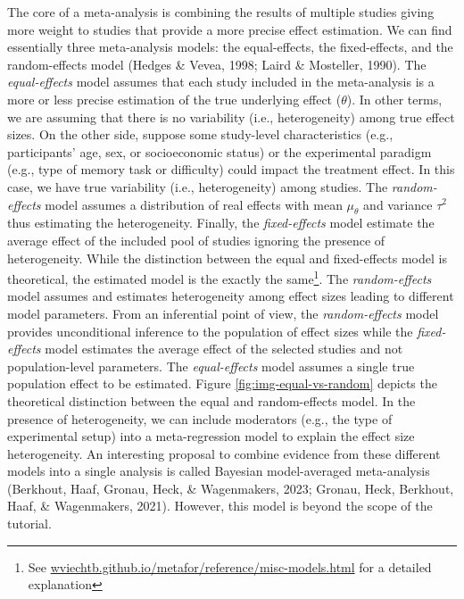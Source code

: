 \documentclass[
  man,floatsintext]{apa6}
\begin{document}
The core of a meta-analysis is combining the results of multiple studies giving more weight to studies that provide a more precise effect estimation. We can find essentially three meta-analysis models: the equal-effects, the fixed-effects, and the random-effects model (Hedges \& Vevea, 1998; Laird \& Mosteller, 1990). The \emph{equal-effects} model assumes that each study included in the meta-analysis is a more or less precise estimation of the true underlying effect (\(\theta\)). In other terms, we are assuming that there is no variability (i.e., heterogeneity) among true effect sizes. On the other side, suppose some study-level characteristics (e.g., participants' age, sex, or socioeconomic status) or the experimental paradigm (e.g., type of memory task or difficulty) could impact the treatment effect. In this case, we have true variability (i.e., heterogeneity) among studies. The \emph{random-effects} model assumes a distribution of real effects with mean \(\mu_{\theta}\) and variance \(\tau^{2}\) thus estimating the heterogeneity. Finally, the \emph{fixed-effects} model estimate the average effect of the included pool of studies ignoring the presence of heterogeneity. While the distinction between the equal and fixed-effects model is theoretical, the estimated model is the exactly the same\footnote{See \href{https://wviechtb.github.io/metafor/reference/misc-models.html}{wviechtb.github.io/metafor/reference/misc-models.html} for a detailed explanation}. The \emph{random-effects} model assumes and estimates heterogeneity among effect sizes leading to different model parameters. From an inferential point of view, the \emph{random-effects} model provides unconditional inference to the population of effect sizes while the \emph{fixed-effects} model estimates the average effect of the selected studies and not population-level parameters. The \emph{equal-effects} model assumes a single true population effect to be estimated. Figure \ref{fig:img-equal-vs-random} depicts the theoretical distinction between the equal and random-effects model. In the presence of heterogeneity, we can include moderators (e.g., the type of experimental setup) into a meta-regression model to explain the effect size heterogeneity. An interesting proposal to combine evidence from these different models into a single analysis is called Bayesian model-averaged meta-analysis (Berkhout, Haaf, Gronau, Heck, \& Wagenmakers, 2023; Gronau, Heck, Berkhout, Haaf, \& Wagenmakers, 2021). However, this model is beyond the scope of the tutorial.

\scriptsize
\end{document}
